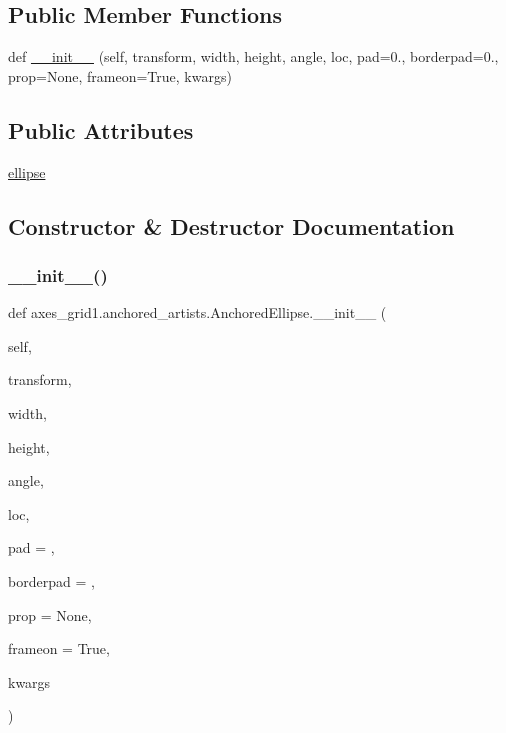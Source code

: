 \subsection*{Public Member Functions}
\begin{DoxyCompactItemize}
\item 
def \hyperlink{classaxes__grid1_1_1anchored__artists_1_1AnchoredEllipse_a4cdc49d6bc44003b44717282babb0cc5}{\+\_\+\+\_\+init\+\_\+\+\_\+} (self, transform, width, height, angle, loc, pad=0., borderpad=0., prop=None, frameon=True, kwargs)
\end{DoxyCompactItemize}
\subsection*{Public Attributes}
\begin{DoxyCompactItemize}
\item 
\hyperlink{classaxes__grid1_1_1anchored__artists_1_1AnchoredEllipse_aa81657b8a26d464cc257f96b244ac560}{ellipse}
\end{DoxyCompactItemize}


\subsection{Constructor \& Destructor Documentation}
\mbox{\label{classaxes__grid1_1_1anchored__artists_1_1AnchoredEllipse_a4cdc49d6bc44003b44717282babb0cc5}} 
\subsubsection{\texorpdfstring{\+\_\+\+\_\+init\+\_\+\+\_\+()}{\_\_init\_\_()}}
{\footnotesize\ttfamily def axes\+\_\+grid1.\+anchored\+\_\+artists.\+Anchored\+Ellipse.\+\_\+\+\_\+init\+\_\+\+\_\+ (\begin{DoxyParamCaption}\item[{}]{self,  }\item[{}]{transform,  }\item[{}]{width,  }\item[{}]{height,  }\item[{}]{angle,  }\item[{}]{loc,  }\item[{}]{pad = {},  }\item[{}]{borderpad = {},  }\item[{}]{prop = {\ttfamily None},  }\item[{}]{frameon = {\ttfamily True},  }\item[{}]{kwargs }\end{DoxyParamCaption})}

